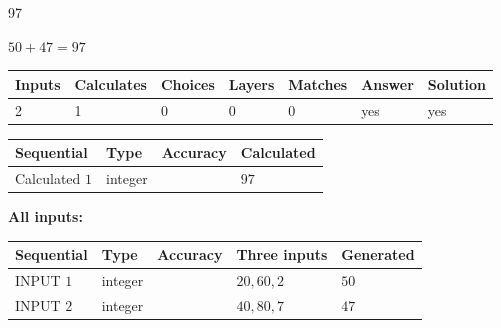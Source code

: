 \documentclass{ctexart}
\begin{document}
 
 
\noindent{}
 
 

97
 
 
\noindent{}
 
 

 
 
 
\noindent{}
 
 

$ %
50 +  %
47=   %
97$
 
 
\noindent{}
 
 

 
   
   
   
   
\noindent\begin{tabular}{|l|l|l|l|l|l|l|}
 \hline
Inputs & Calculates & Choices & Layers & Matches & Answer & Solution \\ \hline
 2  & 
 1  & 
 0
  & 
 0  & 
 0  & 
  yes & 
  yes 
  \\ \hline
 \end{tabular}
   
   
   
   
\noindent{}
   
   
  
  
\noindent\begin{tabular}{|l|l|l|l|}
\hline
 Sequential & Type & Accuracy & Calculated \\ 
\hline
 
 
  Calculated $  1 $ & integer &  & 
  $ 97 $ 
 \\  \hline  
 \end{tabular}
   
   
   
   
\noindent\vspace{0.1in}\hspace{-0.08in} {\textbf{\Large{All inputs: }}}
   
   
  
  
\noindent\begin{tabular}{|l|l|l|l|l|}
\hline
 Sequential & Type & Accuracy & Three inputs & Generated \\ 
\hline
 
 
  INPUT $  1 $ & integer &  & $
 20
 , 
 60
 , 
 2
 $ & $ 50 $ 
 \\  \hline  
 
 
  INPUT $  2 $ & integer &  & $
 40
 , 
 80
 , 
 7
 $ & $ 47 $ 
 \\  \hline  
 \end{tabular}
   
\end{document}
